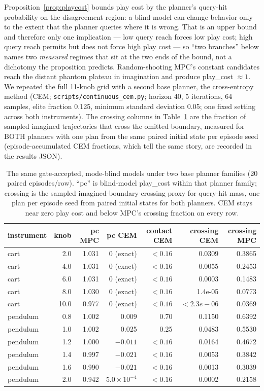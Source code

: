 \documentclass[11pt]{article}
\theoremstyle{definition}
\theoremstyle{remark}
\begin{document}
Proposition~\ref{prop:playcost} bounds play cost by the planner's query-hit probability on the disagreement region: a blind model can change behavior only to the extent that the planner queries where it is wrong. That is an upper bound and therefore only one implication --- low query reach forces low play cost; high query reach permits but does not force high play cost --- so ``two branches'' below names two \emph{measured} regimes that sit at the two ends of the bound, not a dichotomy the proposition predicts. Random-shooting MPC's constant candidates reach the distant phantom plateau in imagination and produce play\_cost ${\approx}1$. We repeated the full 11-knob grid with a second base planner, the cross-entropy method (CEM; \texttt{scripts/continuous\_cem.py}; horizon 40, 5 iterations, 64 samples, elite fraction 0.125, minimum standard deviation 0.05; one fixed setting across both instruments). The crossing columns in Table~\ref{tab:cem} are the fraction of sampled imagined trajectories that cross the omitted boundary, measured for BOTH planners with one plan from the same paired initial state per episode seed (episode-accumulated CEM fractions, which tell the same story, are recorded in the results JSON).

\begin{table}[ht]
\centering
\small
\begin{tabular}{lrrrrrr}
\toprule
instrument & knob & pc MPC & pc CEM & contact CEM & crossing CEM & crossing MPC \\
\midrule
cart & 2.0 & 1.031 & $0$ (exact) & $<0.16$ & 0.0309 & 0.3865 \\
cart & 4.0 & 1.031 & $0$ (exact) & $<0.16$ & 0.0055 & 0.2453 \\
cart & 6.0 & 1.031 & $0$ (exact) & $<0.16$ & 0.0003 & 0.1483 \\
cart & 8.0 & 1.030 & $0$ (exact) & $<0.16$ & 1.4e-05\rlap{$^\dagger$} & 0.0773 \\
cart & 10.0 & 0.977 & $0$ (exact) & $<0.16$ & $<2.3e-06$ & 0.0369 \\
pendulum & 0.8 & 1.002 & 0.009 & 0.70 & 0.1150 & 0.6392 \\
pendulum & 1.0 & 1.002 & 0.025 & 0.25 & 0.0483 & 0.5530 \\
pendulum & 1.2 & 1.000 & $-0.011$ & $<0.16$ & 0.0164 & 0.4672 \\
pendulum & 1.4 & 0.997 & $-0.021$ & $<0.16$ & 0.0053 & 0.3842 \\
pendulum & 1.6 & 0.990 & $-0.021$ & $<0.16$ & 0.0013 & 0.3039 \\
pendulum & 2.0 & 0.942 & $5.0{\times}10^{-4}$ & $<0.16$ & 0.0002 & 0.2158 \\
\bottomrule
\end{tabular}
\caption{The same gate-accepted, mode-blind models under two base planner families (20 paired episodes/row). ``pc'' is blind-model play\_cost within that planner family; crossing is the sampled imagined-boundary-crossing proxy for query-hit mass, one plan per episode seed from paired initial states for both planners. CEM stays near zero play cost and below MPC's crossing fraction on every row.}
\label{tab:cem}
\end{table}
\end{document}
